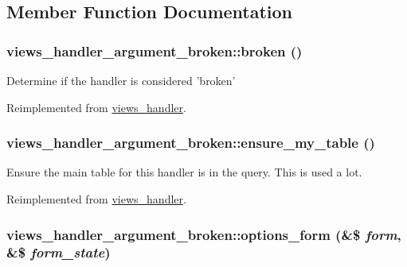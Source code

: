 \subsection{Member Function Documentation}
\hypertarget{classviews__handler__argument__broken_fb6937305424b7b8a2e6fb9e3d4ef1fb}{
\subsubsection[{broken}]{\setlength{\rightskip}{0pt plus 5cm}views\_\-handler\_\-argument\_\-broken::broken ()}}
\label{classviews__handler__argument__broken_fb6937305424b7b8a2e6fb9e3d4ef1fb}


Determine if the handler is considered 'broken' 

Reimplemented from \hyperlink{classviews__handler_c1cd2ff30cb558c79cc908be516fb725}{views\_\-handler}.\hypertarget{classviews__handler__argument__broken_479772a6b1f448d4edf3ff3eef988733}{
\subsubsection[{ensure\_\-my\_\-table}]{\setlength{\rightskip}{0pt plus 5cm}views\_\-handler\_\-argument\_\-broken::ensure\_\-my\_\-table ()}}
\label{classviews__handler__argument__broken_479772a6b1f448d4edf3ff3eef988733}


Ensure the main table for this handler is in the query. This is used a lot. 

Reimplemented from \hyperlink{classviews__handler_947f21ef0f21a77f4d103af4702b3600}{views\_\-handler}.\hypertarget{classviews__handler__argument__broken_dc6789177dec1350859832bc7b242454}{
\subsubsection[{options\_\-form}]{\setlength{\rightskip}{0pt plus 5cm}views\_\-handler\_\-argument\_\-broken::options\_\-form (\&\$ {\em form}, \/  \&\$ {\em form\_\-state})}}
\label{classviews__handler__argument__broken_dc6789177dec1350859832bc7b242454}


